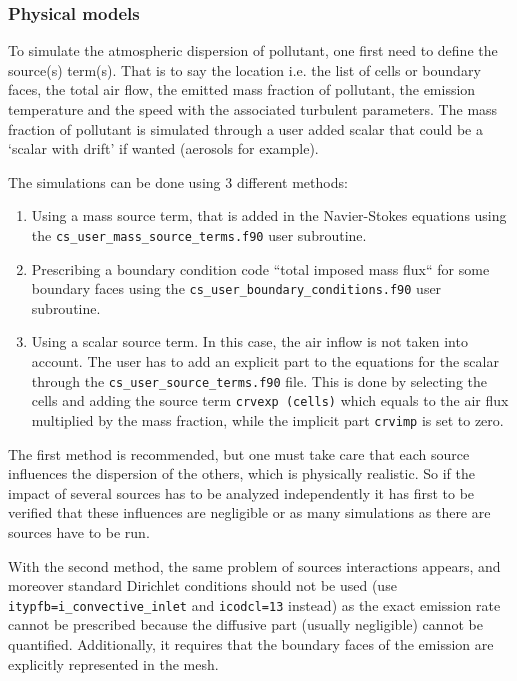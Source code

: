 {{\subsubsection{Physical models}
%
%
To simulate the atmospheric dispersion of pollutant, one first need to define
the source(s) term(s). That is to say the location i.e. the list of cells or
boundary faces, the total air flow, the emitted mass fraction of pollutant,
the emission temperature and the speed with the associated turbulent parameters.
The mass fraction of pollutant is simulated through a user added scalar that
could be a `scalar with drift' if wanted (aerosols for example).

The simulations can be done using 3 different methods:
\begin{enumerate}
\item Using a mass source term, that is added in the Navier-Stokes
equations using the \texttt{cs\_user\_mass\_source\_terms.f90} user subroutine.

\item Prescribing a boundary condition code ``total imposed mass flux`` for
some boundary faces using the \texttt{cs\_user\_boundary\_conditions.f90} user
subroutine.

\item Using a scalar source term. In this case, the air inflow is not taken
into account. The user has to add an explicit part to the equations
for the scalar through the \texttt{cs\_user\_source\_terms.f90} file. This is
done by selecting the cells and adding the source term \texttt{crvexp (cells)}
which equals to the air flux multiplied by the mass fraction, while the
implicit part \texttt{crvimp} is set to zero.
\end{enumerate}

The first method is recommended, but one must take care that each source
influences the dispersion of the others, which is physically realistic. So
if the impact of several sources has to be analyzed independently it has first
to be verified that these influences are negligible or as many simulations
as there are sources have to be run.

With the second method, the same problem of sources interactions appears, and
moreover standard Dirichlet conditions should not be used (use
\texttt{itypfb=i\_convective\_inlet} and \texttt{icodcl=13} instead) as
the exact emission rate cannot be prescribed because the diffusive part
(usually negligible) cannot be quantified. Additionally, it requires that
the boundary faces of the emission are explicitly represented in the mesh.

}}
